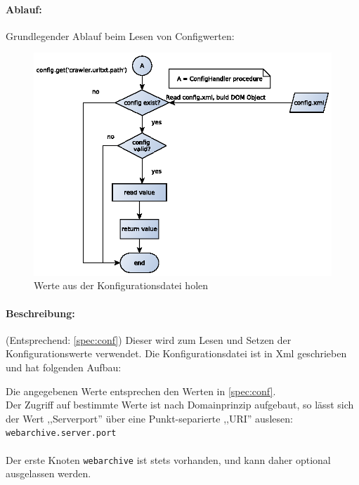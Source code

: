 \paragraph{Ablauf:}
\label{par:ablauf_}
Grundlegender Ablauf beim Lesen von Configwerten:
\begin{figure}[H]
	\centering
	\label{dia:design:backend:overview}
	\includegraphics[width=1.2\textwidth]{design/backend/gfx/getting_value.eps}
	\caption{Werte aus der Konfigurationsdatei holen}
\end{figure}

\paragraph{Beschreibung:}
(Entsprechend: \ref{spec:conf})
\label{par:beschreibung_}
Dieser wird zum Lesen und Setzen der Konfigurationswerte verwendet. Die Konfigurationsdatei ist in 
Xml geschrieben und hat folgenden Aufbau:
    

Die angegebenen Werte entsprechen den Werten in \ref{spec:conf}.
\\
Der Zugriff auf bestimmte Werte ist nach Domainprinzip aufgebaut, so
lässt sich der Wert ,,Serverport'' über eine Punkt-separierte ,,URI'' auslesen: \texttt{webarchive.server.port} 
\\ \\
Der erste Knoten \texttt{webarchive} ist stets vorhanden, und kann daher optional ausgelassen werden.

